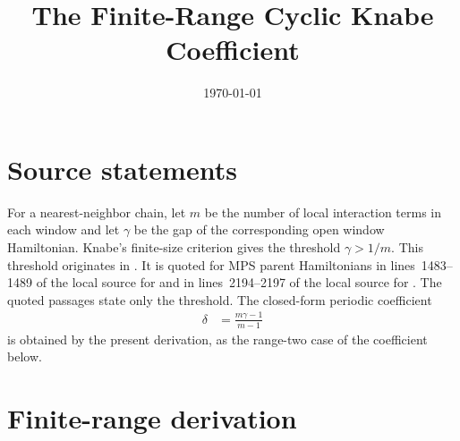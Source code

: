 \documentclass{article}
\title{The Finite-Range Cyclic Knabe Coefficient}
\author{}
\date{\today}
\begin{document}
\maketitle

\section{Source statements}

For a nearest-neighbor chain, let $m$ be the number of local interaction
terms in each window and let $\gamma$ be the gap of the corresponding open
window Hamiltonian. Knabe's finite-size criterion gives the threshold
$\gamma>1/m$. This threshold originates in \cite{Knabe1988Energy}. It is
quoted for MPS parent Hamiltonians in lines~1483--1489 of the local source for
\cite{PerezGarcia2007Matrix} and in lines~2194--2197 of the local source for
\cite{Cirac2021Matrix}. The quoted passages state only the threshold. The
closed-form periodic coefficient
\begin{align}
    \delta&=\frac{m\gamma-1}{m-1}
\end{align}
is obtained by the present derivation, as the range-two case of the coefficient
below.

\section{Finite-range derivation}
\end{document}
